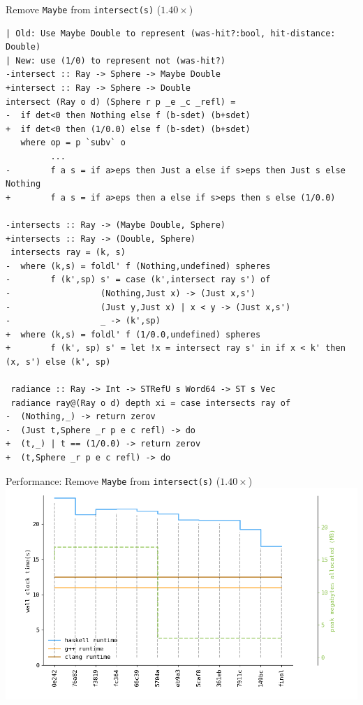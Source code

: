 \documentclass[8pt]{beamer}
\begin{document}
\begin{frame}[fragile]{Remove \texttt{Maybe} from \texttt{intersect(s)} ($1.40\times$)}
\begin{verbatim}
| Old: Use Maybe Double to represent (was-hit?:bool, hit-distance: Double)
| New: use (1/0) to represent not (was-hit?)
-intersect :: Ray -> Sphere -> Maybe Double
+intersect :: Ray -> Sphere -> Double
intersect (Ray o d) (Sphere r p _e _c _refl) =
-  if det<0 then Nothing else f (b-sdet) (b+sdet)
+  if det<0 then (1/0.0) else f (b-sdet) (b+sdet)
   where op = p `subv` o
         ...
-        f a s = if a>eps then Just a else if s>eps then Just s else Nothing
+        f a s = if a>eps then a else if s>eps then s else (1/0.0)

-intersects :: Ray -> (Maybe Double, Sphere)
+intersects :: Ray -> (Double, Sphere)
 intersects ray = (k, s)
-  where (k,s) = foldl' f (Nothing,undefined) spheres
-        f (k',sp) s' = case (k',intersect ray s') of
-                  (Nothing,Just x) -> (Just x,s')
-                  (Just y,Just x) | x < y -> (Just x,s')
-                  _ -> (k',sp)
+  where (k,s) = foldl' f (1/0.0,undefined) spheres
+        f (k', sp) s' = let !x = intersect ray s' in if x < k' then (x, s') else (k', sp)
 
 radiance :: Ray -> Int -> STRefU s Word64 -> ST s Vec
 radiance ray@(Ray o d) depth xi = case intersects ray of
-  (Nothing,_) -> return zerov
-  (Just t,Sphere _r p e c refl) -> do
+  (t,_) | t == (1/0.0) -> return zerov
+  (t,Sphere _r p e c refl) -> do
\end{verbatim}

\end{frame}

\begin{frame}[fragile]{Performance: Remove \texttt{Maybe} from \texttt{intersect(s)} ($1.40\times$)}
\includegraphics[height=0.6\textwidth]{perfdata-upto-149bc-gen.png}
\end{frame}
\end{document}
